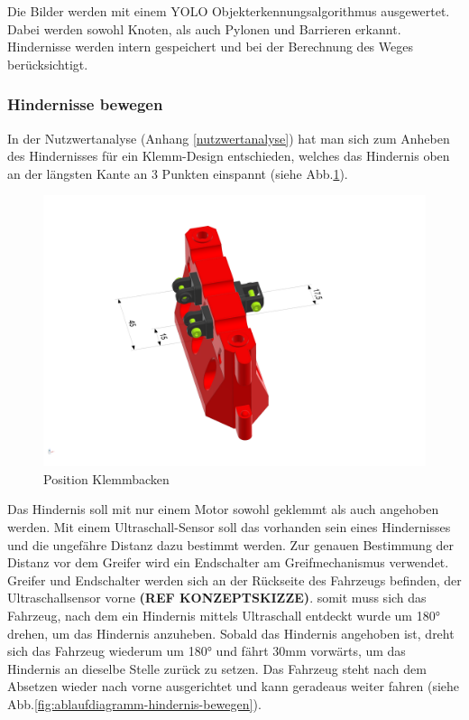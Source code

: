 Die Bilder werden mit einem YOLO Objekterkennungsalgorithmus ausgewertet. Dabei werden sowohl Knoten, als auch Pylonen und Barrieren erkannt. Hindernisse werden intern gespeichert und bei der Berechnung des Weges berücksichtigt.


\newpage

\subsubsection{Hindernisse bewegen}

In der Nutzwertanalyse (Anhang \ref{nutzwertanalyse}) hat man sich zum Anheben des Hindernisses für ein Klemm-Design entschieden, welches das Hindernis oben an der längsten Kante an 3 Punkten einspannt (siehe Abb.\ref{fig:obstacle_clamping_concept}). 

\begin{figure}[H]
\centering
\includegraphics[width=0.95\linewidth]{assets/greifer-prototyp/Greifer_Backen_Trimetric.png} 
\caption{Position Klemmbacken}
\label{fig:obstacle_clamping_concept}
\end{figure}

Das Hindernis soll mit nur einem Motor sowohl geklemmt als auch angehoben werden. Mit einem Ultraschall-Sensor soll das vorhanden sein eines Hindernisses und die ungefähre Distanz dazu bestimmt werden. Zur genauen Bestimmung der Distanz vor dem Greifer wird ein Endschalter am Greifmechanismus verwendet.
Greifer und Endschalter werden sich an der Rückseite des Fahrzeugs befinden, der Ultraschallsensor vorne \textbf{(REF KONZEPTSKIZZE)}. somit muss sich das Fahrzeug, nach dem ein Hindernis mittels Ultraschall entdeckt wurde um 180° drehen, um das Hindernis anzuheben. Sobald das Hindernis angehoben ist, dreht sich das Fahrzeug wiederum um 180° und fährt 30mm vorwärts, um das Hindernis an dieselbe Stelle zurück zu setzen. Das Fahrzeug steht nach dem Absetzen wieder nach vorne ausgerichtet und kann geradeaus weiter fahren (siehe  Abb.\ref{fig:ablaufdiagramm-hindernis-bewegen}). 

